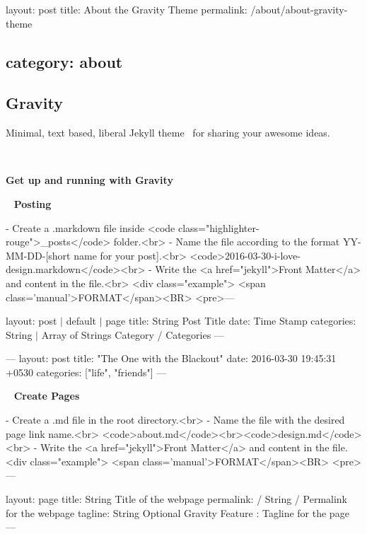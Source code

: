 

 layout\+: post title\+: About the Gravity Theme permalink\+: /about/about-\/gravity-\/theme \subsection*{category\+: about }

\subsection*{Gravity}

Minimal, text based, liberal Jekyll theme~\newline
for sharing your awesome ideas.

~\newline
 \begin{center}\end{center} 

\begin{center}{\bfseries Get up and running with Gravity}\end{center} 

\begin{center}\end{center}  ~\newline
   {\bfseries Posting}  

  \begin{DoxyVerb}  - Create a .markdown file inside <code class="highlighter-rouge">_posts</code> folder.<br>
  - Name the file according to the format YY-MM-DD-[short name for your post].<br>  <code>2016-03-30-i-love-design.markdown</code><br>
  - Write the <a href="jekyll">Front Matter</a> and content in the file.<br>
  <div class="example">
    <span class='manual'>FORMAT</span><BR>
    <pre>---
\end{DoxyVerb}
 layout\+: post $\vert$ default $\vert$ page title\+: String Post Title date\+: Time Stamp categories\+: String $\vert$ Array of Strings Category / Categories  ---  

 
\begin{DoxyPre}---
layout: post
title:  "The One with the Blackout"
date:   2016-03-30 19:45:31 +0530
categories: ["life", "friends"]
---\end{DoxyPre}
 

  

~\newline
   {\bfseries Create Pages}  

  \begin{DoxyVerb}  - Create a .md file in the root directory.<br>
  - Name the file with the desired page link name.<br>  <code>about.md</code><br><code>design.md</code><br>
  - Write the <a href="jekyll">Front Matter</a> and content in the file.
  <div class="example">
    <span class='manual'>FORMAT</span><BR>
    <pre>---
\end{DoxyVerb}
 layout\+: page title\+: String Title of the webpage permalink\+: / String / Permalink for the webpage tagline\+: String Optional Gravity Feature \+: Tagline for the page ---  

